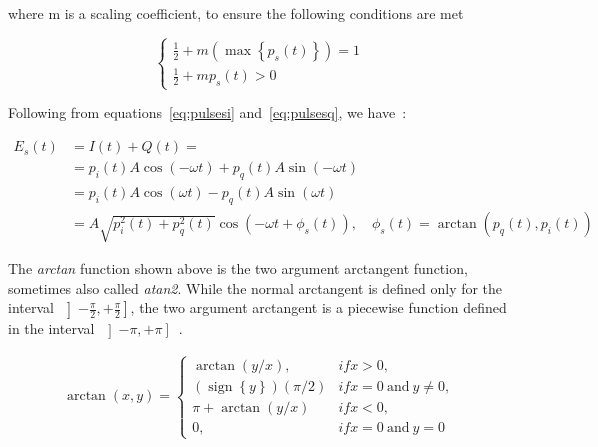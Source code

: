 	\noindent where m is a scaling coefficient, to ensure the following
	conditions are met

	\begin{equation*}
		\begin{cases}
			\frac{1}{2}+m \left(\max\left\{p_s(t)\right\}\right) = 1 \\
			\frac{1}{2}+m p_s(t) > 0
		\end{cases}
	\end{equation*}

	Following from equations~\ref{eq:pulsesi} and~\ref{eq:pulsesq}, we
	have~\cite{apostol67,oo12}:

	\begin{equation}\label{eq:sigEq}
		\begin{split}
			E_s(t) &= I(t) + Q(t)  = \\
					 &= p_i(t) A\cos(-\omega t)+ p_q(t) A\sin(-\omega t) \\
					 &= p_i(t) A\cos(\omega t)- p_q(t) A\sin(\omega t) \\
					 &= A \sqrt{p_i^2(t) + p_q^2(t)} \cos{\left(- \omega t +
					 \phi_s(t)\right)}, \quad  \phi_s(t)=
					 \operatorname{arctan}{\left({p_q(t)},{p_i(t)}\right)}
		\end{split}
	\end{equation}

	The \textit{arctan} function shown above is the two argument arctangent
	function, sometimes also called \textit{atan2}. While
	the normal arctangent is defined only for the interval~$\left]-\frac{\pi}{2},
	+\frac{\pi}{2}\right]$, the two argument arctangent is a piecewise function
defined in the interval~$\left]-{\pi}, +{\pi}\right]$~\cite{glisson11}.

	\begin{align}
		\arctan(x,y) = \begin{cases}
			\arctan(y/x),                                  & if x > 0,\\
			\left(\operatorname{sign}\left\{y\right\}\right) \left({\pi}/{2}\right)  & if x = 0~\text{and}~y \neq 0, \\
			\pi +  \operatorname{arctan}({y/x})            & if x < 0, \\
			0,                                             & if x = 0~\text{and}~y = 0
		\end{cases}
	\end{align}


